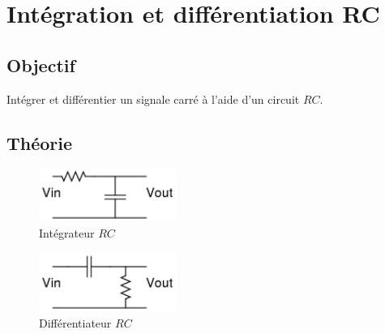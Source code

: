 \documentclass{book}
\begin{document}




\section{Intégration et différentiation RC}



\subsection{Objectif}


Intégrer et différentier un signale carré à l'aide d'un circuit $RC$.

\subsection{Théorie}


\begin{figure}[h!]
\begin{center}
\caption{\label{fig:RC-Integ}Intégrateur $RC$ }\vspace{0.5em}
\includegraphics[width=0.4\textwidth, height=0.3\textwidth, keepaspectratio]{Schematic-RCinteg.png}
\end{center}
\end{figure}



\begin{figure}[h!]
\begin{center}
\caption{\label{fig:RC-diff}Différentiateur $RC$ }\vspace{0.5em}
\includegraphics[width=0.4\textwidth, height=0.3\textwidth, keepaspectratio]{Schematic-RCdiff.png}
\end{center}
\end{figure}
\end{document}
